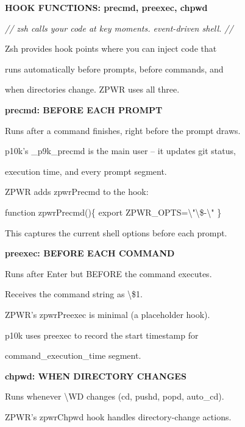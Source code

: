 \documentclass[11pt,a4paper,twoside]{book}
\begin{document}
\vspace{10pt}
{\large\bfseries\color{neoncyan} HOOK FUNCTIONS: precmd, preexec, chpwd}\vspace{6pt}

{\small\itshape\color{dimtext} // zsh calls your code at key moments. event-driven shell. //}

Zsh provides hook points where you can inject code that

runs automatically before prompts, before commands, and

when directories change. ZPWR uses all three.


\vspace{12pt}
{\bfseries\color{neonyellow} precmd: BEFORE EACH PROMPT}\vspace{4pt}

Runs after a command finishes, right before the prompt draws.

p10k's \_p9k\_precmd is the main user -- it updates git status,

execution time, and every prompt segment.

ZPWR adds zpwrPrecmd to the hook:

\begin{codebox}
function zpwrPrecmd()\{ export ZPWR\_OPTS=\textbackslash{}"\textbackslash{}\$-\textbackslash{}" \}\\
\end{codebox}

This captures the current shell options before each prompt.


\vspace{12pt}
{\bfseries\color{neonyellow} preexec: BEFORE EACH COMMAND}\vspace{4pt}

Runs after Enter but BEFORE the command executes.

Receives the command string as \textbackslash{}\$1.

ZPWR's zpwrPreexec is minimal (a placeholder hook).

p10k uses preexec to record the start timestamp for

command\_execution\_time segment.


\vspace{12pt}
{\bfseries\color{neonyellow} chpwd: WHEN DIRECTORY CHANGES}\vspace{4pt}

Runs whenever \textbackslash{}WD changes (cd, pushd, popd, auto\_cd).

ZPWR's zpwrChpwd hook handles directory-change actions.
\end{document}
